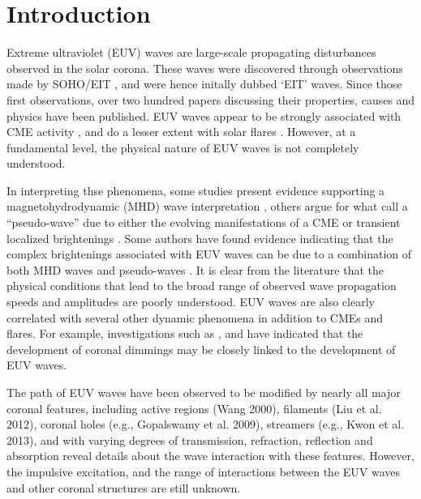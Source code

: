 \section{Introduction}\label{sec:Intro}

Extreme ultraviolet (EUV) waves are large-scale propagating
disturbances observed in the solar corona. These waves were discovered
through observations made by SOHO/EIT \citep{1997SoPh..175..571M,
  1998GeoRL..25.2465T, 1999ApJ...517L.151T}, and were hence initally
dubbed `EIT' waves. Since those first observations, over two hundred
papers discussing their properties, causes and physics have been
published. EUV waves appear to be strongly associated with CME
activity \cite{2002ApJ...569.1009B}, and do a lesser extent with solar
flares \cite{2006ApJ...641L.153}. However, at a fundamental level, the
physical nature of EUV waves is not completely understood.

In interpreting thse phenomena, some studies present evidence
supporting a magnetohydrodynamic (MHD) wave interpretation
\citep{1998GeoRL..25.2465T, 1999ApJ...517L.151T,2000ApJ...543L..89W,
  2001JGR...10625089W, 2002ApJ...574..440O, 2010ApJ...713.1008S},
others argue for what \cite{2012SoPh..281..187P} call a “pseudo-wave”
due to either the evolving manifestations of a CME
\citep{1999SoPh..190..107D, 2000ApJ...545..512D, 2008SoPh..247..123D,
  2011ApJ...738..167S} or transient localized brightenings
\citep{2007AN....328..760A, 2007ApJ...656L.101A,}.  Some authors have
found evidence indicating that the complex brightenings associated
with EUV waves can be due to a combination of both MHD waves and
pseudo-waves \citep{2002ApJ...572L..99C, 2005ApJ...622.1202C,
  2004A&A...427..705Z, 2009ApJ...705..587C}.  It is clear from the
literature that the physical conditions that lead to the broad range
of observed wave propagation speeds \citep{2011A&A...532A.151W} and
amplitudes are poorly understood. EUV waves are also clearly
correlated with several other dynamic phenomena in addition to CMEs
and flares. For example, investigations such as
\cite{2000SoPh..193..161T}, \cite{2004A&A...427..705Z} and
\cite{2010ApJ...709..369P} have indicated that the development of
coronal dimmings may be closely linked to the development of EUV
waves.

The path of EUV waves have been observed to be modified by nearly all
major coronal features, including active regions (Wang 2000),
filaments (Liu et al. 2012), coronal holes (e.g., Gopalswamy et
al. 2009), streamers (e.g., Kwon et al. 2013), and with varying
degrees of transmission, refraction, reflection and absorption reveal
details about the wave interaction with these features. However, the
impulsive excitation, and the range of interactions between the EUV
waves and other coronal structures are still unknown.

